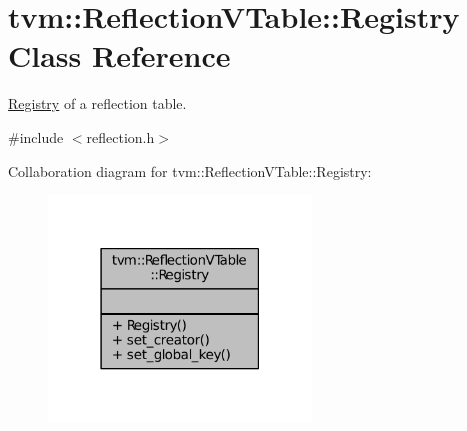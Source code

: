 \hypertarget{classtvm_1_1ReflectionVTable_1_1Registry}{}\section{tvm\+:\+:Reflection\+V\+Table\+:\+:Registry Class Reference}
\label{classtvm_1_1ReflectionVTable_1_1Registry}


\hyperlink{classtvm_1_1ReflectionVTable_1_1Registry}{Registry} of a reflection table.  




{\ttfamily \#include $<$reflection.\+h$>$}



Collaboration diagram for tvm\+:\+:Reflection\+V\+Table\+:\+:Registry\+:
\nopagebreak
\begin{figure}[H]
\begin{center}
\leavevmode
\includegraphics[width=198pt]{classtvm_1_1ReflectionVTable_1_1Registry__coll__graph}
\end{center}
\end{figure}
